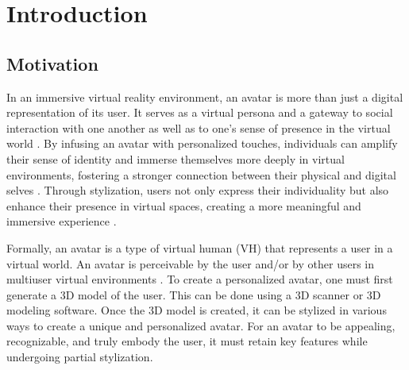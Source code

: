 \chapter{Introduction}

\section{Motivation}
In an immersive virtual reality environment, an avatar is more than just a digital representation of its user. It serves as a virtual persona and a gateway to social interaction with one another as well as to one's sense of presence in the virtual world . By infusing an avatar with personalized touches, individuals can amplify their sense of identity and immerse themselves more deeply in virtual environments, fostering a stronger connection between their physical and digital selves . Through stylization, users not only express their individuality but also enhance their presence in virtual spaces, creating a more meaningful and immersive experience .

Formally, an avatar is a type of virtual human (VH) that represents a user in a virtual world. An avatar is perceivable by the user and/or by other users in multiuser virtual environments \citep{Nowak.2018}. To create a personalized avatar, one must first generate a 3D model of the user. This can be done using a 3D scanner or 3D modeling software. Once the 3D model is created, it can be stylized in various ways to create a unique and personalized avatar. For an avatar to be appealing, recognizable, and truly embody the user, it must retain key features while undergoing partial stylization.

